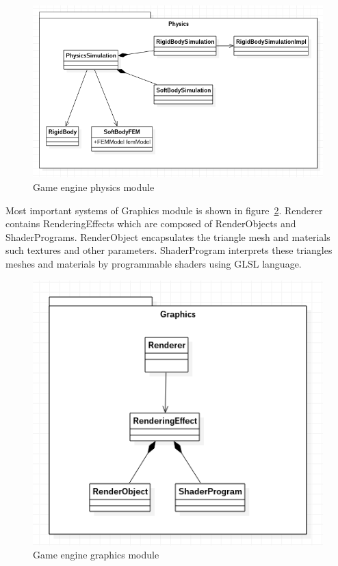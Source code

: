 \documentclass[en]{minipw} %
\begin{document}
\begin{figure}[h!]
\centering
\includegraphics[scale=0.5]{pictures/ifx_physics.png}
\caption[Game engine physics module]{Game engine physics module}
\label{fig:ifx_physics}
\end{figure}

Most important systems of Graphics module is shown in figure~\ref{fig:ifx_graphics}. Renderer contains RenderingEffects which are composed of RenderObjects and ShaderPrograms. RenderObject encapsulates the triangle mesh and materials such textures and other parameters. ShaderProgram interprets these triangles meshes and materials by programmable shaders using GLSL language.

\begin{figure}[h!]
\centering
\includegraphics[scale=0.5]{pictures/ifx_graphics.png}
\caption[Game engine graphics module]{Game engine graphics module}
\label{fig:ifx_graphics}
\end{figure}
\end{document}
